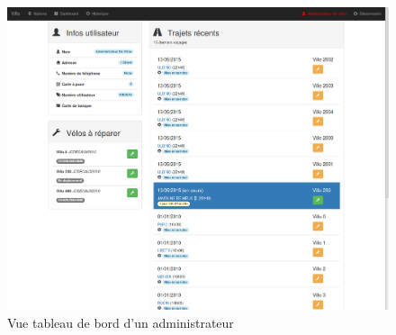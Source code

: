 \documentclass[a4paper,10pt]{article}
\begin{document}
\begin{figure}[H]
  \centering
  \includegraphics[width=.9\textwidth]{Dashboard-admin.png}
  \caption{\label{fig:dashboard} Vue tableau de bord d'un administrateur}
\end{figure}
\end{document}
